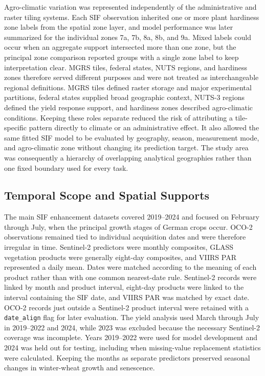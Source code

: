 Agro-climatic variation was represented independently of the administrative and raster tiling systems. Each SIF observation inherited one or more plant hardiness zone labels from the spatial zone layer, and model performance was later summarized for the individual zones 7a, 7b, 8a, 8b, and 9a. Mixed labels could occur when an aggregate support intersected more than one zone, but the principal zone comparison reported groups with a single zone label to keep interpretation clear. MGRS tiles, federal states, NUTS regions, and hardiness zones therefore served different purposes and were not treated as interchangeable regional definitions. MGRS tiles defined raster storage and major experimental partitions, federal states supplied broad geographic context, NUTS-3 regions defined the yield response support, and hardiness zones described agro-climatic conditions. Keeping these roles separate reduced the risk of attributing a tile-specific pattern directly to climate or an administrative effect. It also allowed the same fitted SIF model to be evaluated by geography, season, measurement mode, and agro-climatic zone without changing its prediction target. The study area was consequently a hierarchy of overlapping analytical geographies rather than one fixed boundary used for every task.

\subsection{Temporal Scope and Spatial Supports}

The main SIF enhancement datasets covered 2019--2024 and focused on February through July, when the principal growth stages of German crops occur. OCO-2 observations remained tied to individual acquisition dates and were therefore irregular in time. Sentinel-2 predictors were monthly composites, GLASS vegetation products were generally eight-day composites, and VIIRS PAR represented a daily mean. Dates were matched according to the meaning of each product rather than with one common nearest-date rule. Sentinel-2 records were linked by month and product interval, eight-day products were linked to the interval containing the SIF date, and VIIRS PAR was matched by exact date. OCO-2 records just outside a Sentinel-2 product interval were retained with a \texttt{date\_align} flag for later evaluation. The yield analysis used March through July in 2019--2022 and 2024, while 2023 was excluded because the necessary Sentinel-2 coverage was incomplete. Years 2019--2022 were used for model development and 2024 was held out for testing, including when missing-value replacement statistics were calculated. Keeping the months as separate predictors preserved seasonal changes in winter-wheat growth and senescence.

